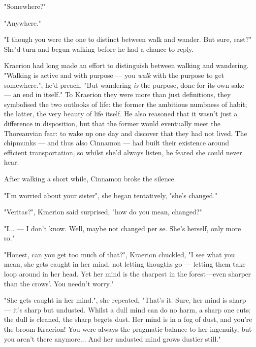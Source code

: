 "Somewhere?"

"Anywhere."

"I though you were the one to distinct between walk and wander. But sure, east?"
She'd turn and begun walking before he had a chance to reply. 


Kraerion had long made an effort to distinguish between walking and wandering. "Walking is active and with purpose — you \textit{walk} with the purpose to get somewhere.", he'd preach, "But wandering \textit{is} the purpose, done for its own sake — an end in itself." To Kraerion they were more than just definitions, they symbolised the two outlooks of life: the former the ambitious numbness of habit; the latter, the very beauty of life itself. He also reasoned that it wasn't just a difference in disposition, but that the former would eventually meet the Thoreauvian fear: to wake up one day and discover that they had not lived. The chipmunks — and thus also Cinnamon — had built their existence around efficient transportation, so whilst she'd always listen, he feared she could never hear.

After walking a short while, Cinnamon broke the silence.

"I'm worried about your sister", she began tentatively, "she's changed." 

"Veritas?", Kraerion said surprised, "how do you mean, changed?"

"I... — I don't know. Well, maybe not changed per se. She's herself, only more so."



"Honest, can you get too much of that?", Kraerion chuckled, "I see what you mean, she gets caught in her mind, not letting thougths go — letting them take loop around in her head. Yet her mind is the sharpest in the forest—even sharper than the crows'. You needn't worry."

"She gets caught in her mind.", she repeated, "That's it. Sure, her mind is sharp — it's sharp but undusted. Whilst a dull mind can do no harm, a sharp one cuts; the dull is cleaned, the sharp begets dust. Her mind is in a fog of dust, and you're the broom Kraerion! You were always the pragmatic balance to her ingenuity, but you aren't there anymore... And her undusted mind grows dustier still."

